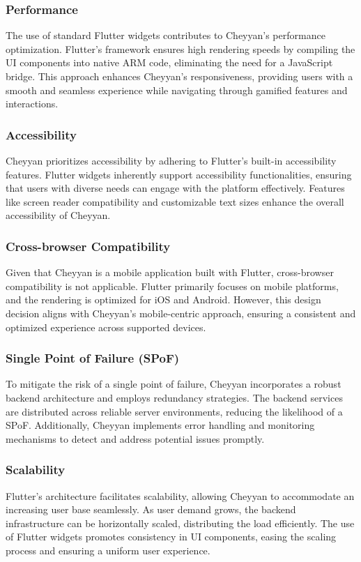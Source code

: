 \documentclass{l4proj}
\begin{document}
\subsubsection{Performance}
The use of standard Flutter widgets contributes to Cheyyan's performance optimization. Flutter's framework ensures high rendering speeds by compiling the UI components into native ARM code, eliminating the need for a JavaScript bridge. This approach enhances Cheyyan's responsiveness, providing users with a smooth and seamless experience while navigating through gamified features and interactions.

\subsubsection{Accessibility}
Cheyyan prioritizes accessibility by adhering to Flutter's built-in accessibility features. Flutter widgets inherently support accessibility functionalities, ensuring that users with diverse needs can engage with the platform effectively. Features like screen reader compatibility and customizable text sizes enhance the overall accessibility of Cheyyan.

\subsubsection{Cross-browser Compatibility}
Given that Cheyyan is a mobile application built with Flutter, cross-browser compatibility is not applicable. Flutter primarily focuses on mobile platforms, and the rendering is optimized for iOS and Android. However, this design decision aligns with Cheyyan's mobile-centric approach, ensuring a consistent and optimized experience across supported devices.

\subsubsection{Single Point of Failure (SPoF)}
To mitigate the risk of a single point of failure, Cheyyan incorporates a robust backend architecture and employs redundancy strategies. The backend services are distributed across reliable server environments, reducing the likelihood of a SPoF. Additionally, Cheyyan implements error handling and monitoring mechanisms to detect and address potential issues promptly.

\subsubsection{Scalability}
Flutter's architecture facilitates scalability, allowing Cheyyan to accommodate an increasing user base seamlessly. As user demand grows, the backend infrastructure can be horizontally scaled, distributing the load efficiently. The use of Flutter widgets promotes consistency in UI components, easing the scaling process and ensuring a uniform user experience.
\end{document}

